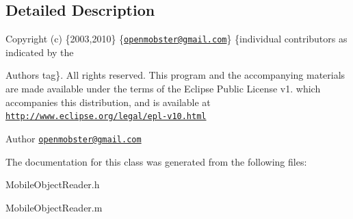 \subsection{\-Detailed \-Description}
\-Copyright (c) \{2003,2010\} \{\href{mailto:openmobster@gmail.com}{\tt openmobster@gmail.\-com}\} \{individual contributors as indicated by the \begin{DoxyAuthor}{\-Authors}
tag\}. \-All rights reserved. \-This program and the accompanying materials are made available under the terms of the \-Eclipse \-Public \-License v1. which accompanies this distribution, and is available at \href{http://www.eclipse.org/legal/epl-v10.html}{\tt http\-://www.\-eclipse.\-org/legal/epl-\/v10.\-html}
\end{DoxyAuthor}
\begin{DoxyAuthor}{\-Author}
\href{mailto:openmobster@gmail.com}{\tt openmobster@gmail.\-com} 
\end{DoxyAuthor}


\-The documentation for this class was generated from the following files\-:\begin{DoxyCompactItemize}
\item 
\-Mobile\-Object\-Reader.\-h\item 
\-Mobile\-Object\-Reader.\-m\end{DoxyCompactItemize}
